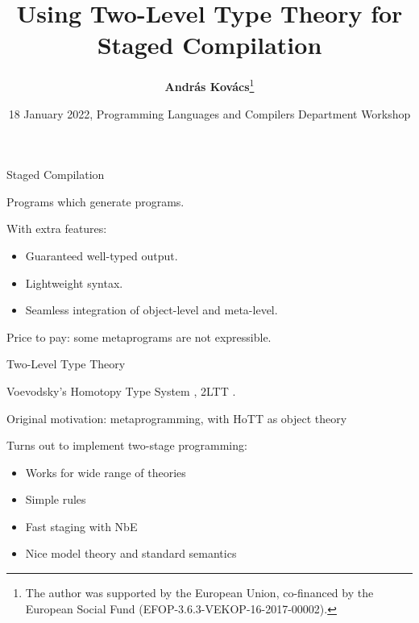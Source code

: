 \documentclass[dvipsnames,10pt,aspectratio=169]{beamer}
\title{Using Two-Level Type Theory for Staged Compilation}
\date{18 January 2022, Programming Languages and Compilers Department Workshop}
\author{\normalsize{\vspace{-1em}\textbf{András Kovács}\footnote{The author was supported by the European Union,
co-financed by the European Social Fund (EFOP-3.6.3-VEKOP-16-2017-00002).\vspace{0.5em}}}}
\begin{document}
\maketitle


\begin{frame}{Staged Compilation}

Programs which generate programs.
\vspace{1em}
\pause

With extra features:
\begin{itemize}
  \item Guaranteed well-typed output.
  \item Lightweight syntax.
  \item Seamless integration of object-level and meta-level.
\end{itemize}
\pause

Price to pay: some metaprograms are not expressible.

\end{frame}


\begin{frame}{Two-Level Type Theory}

Voevodsky's Homotopy Type System \cite{voevodsky2013simple}, 2LTT \cite{twolevel}.
\vspace{1em}

Original motivation: metaprogramming, with HoTT as object theory
\vspace{1em}
\pause

Turns out to implement two-stage programming:
\begin{itemize}
  \item Works for wide range of theories
  \pause
  \item Simple rules
  \pause
  \item Fast staging with NbE
  \pause
  \item Nice model theory and standard semantics
\end{itemize}

\end{frame}
\end{document}
